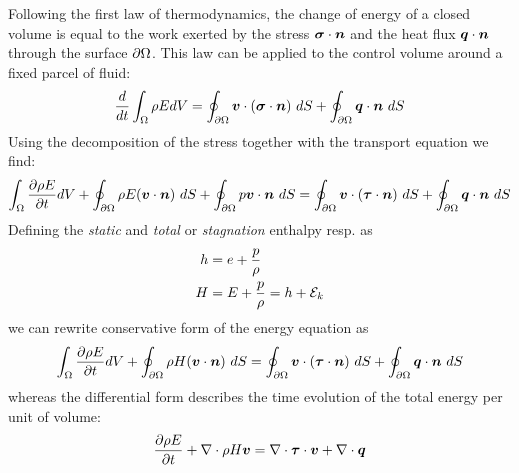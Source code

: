 Following the first law of thermodynamics, the change of energy of a
closed volume is equal to the work exerted by the stress $\boldsymbol {\sigma}
\cdot \boldsymbol {n}$ and the heat flux $\boldsymbol {q} \cdot \boldsymbol {n}$ through the
surface ${\partial \Omega}$. This law can be applied to the control volume around a
fixed parcel of fluid:
\begin{align*}
  \frac{d}{dt} \int_{\Omega} \rho E dV = 
  \oint_{{\partial \Omega}} \boldsymbol {v} \cdot (\boldsymbol {\sigma} \cdot \boldsymbol {n})~dS + 
  \oint_{{\partial \Omega}} \boldsymbol {q} \cdot \boldsymbol {n}~dS 
\end{align*}
Using the decomposition of the stress together with the transport
equation we find:
\begin{align*}
  \int_{\Omega} \frac{\partial \rho E}{\partial t} dV + 
  \oint_{{\partial \Omega}} \rho E (\boldsymbol {v} \cdot \boldsymbol {n})~dS + 
  \oint_{{\partial \Omega}} p \boldsymbol {v} \cdot \boldsymbol {n}~dS = 
  \oint_{{\partial \Omega}} \boldsymbol {v} \cdot (\boldsymbol {\tau} \cdot \boldsymbol {n})~dS +
  \oint_{{\partial \Omega}} \boldsymbol {q} \cdot \boldsymbol {n}~dS
\end{align*}
Defining the \emph{static} and \emph{total} or \emph{stagnation}
enthalpy resp. as
\begin{align*}
  h &= e + \frac{p}{\rho} \\
  H &= E + \frac{p}{\rho} = h + \mathcal E_k
\end{align*}
we can rewrite conservative form of the energy equation as
\begin{equation}
  \int_{\Omega} \frac{\partial \rho E}{\partial t} dV + 
  \oint_{{\partial \Omega}} \rho H (\boldsymbol {v} \cdot \boldsymbol {n})~dS  = 
  \oint_{{\partial \Omega}} \boldsymbol {v} \cdot (\boldsymbol {\tau} \cdot \boldsymbol {n})~dS +
  \oint_{{\partial \Omega}} \boldsymbol {q} \cdot \boldsymbol {n}~dS
  \label{eq:energyConservationIntegral}
\end{equation}
whereas the differential form describes the time evolution of the
total energy per unit of volume:
\begin{equation}
  \frac{\partial \rho E}{\partial t} + \nabla \cdot \rho H \boldsymbol {v}   = 
  \nabla \cdot \boldsymbol {\tau} \cdot \boldsymbol {v} + \nabla \cdot \boldsymbol {q}
  \label{eq:energyConservationDifferential}
\end{equation}


